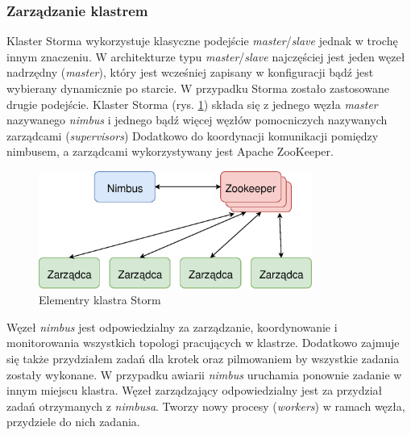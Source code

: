 \subsubsection*{Zarządzanie klastrem}
Klaster Storma wykorzystuje klasyczne podejście \textit{master}/\textit{slave}
jednak w trochę innym znaczeniu.
W architekturze typu \textit{master}/\textit{slave} najczęściej jest jeden węzeł nadrzędny (\textit{master}),
który jest wcześniej zapisany w konfiguracji
bądź jest wybierany dynamicznie po starcie.
W przypadku Storma zostało zastosowane drugie podejście.
Klaster Storma (rys. \ref{fig:StormCluster}) składa się z jednego węzła \textit{master} nazywanego \textit{nimbus}
i jednego bądź więcej węzłów pomocniczych nazywanych zarządcami (\textit{supervisors})
Dodatkowo do koordynacji komunikacji pomiędzy nimbusem,
a zarządcami wykorzystywany jest Apache ZooKeeper.
\begin{figure}[htbp]
  \centering
  \includegraphics[width=0.8\textwidth]{img/stormCluster}
  \caption{Elementry klastra Storm}
  \label{fig:StormCluster}
\end{figure}

Węzeł \textit{nimbus} jest odpowiedzialny za zarządzanie,
koordynowanie i monitorowania wszystkich topologi pracujących w klastrze.
Dodatkowo zajmuje się także przydziałem zadań dla krotek
oraz pilmowaniem by wszystkie zadania zostały wykonane.
W przypadku awiarii \textit{nimbus} uruchamia ponownie zadanie w innym miejscu klastra.
Węzeł zarządzający odpowiedzialny jest za przydział zadań otrzymanych z \textit{nimbusa}.
Tworzy nowy procesy (\textit{workers}) w ramach węzła,
przydziele do nich zadania.
